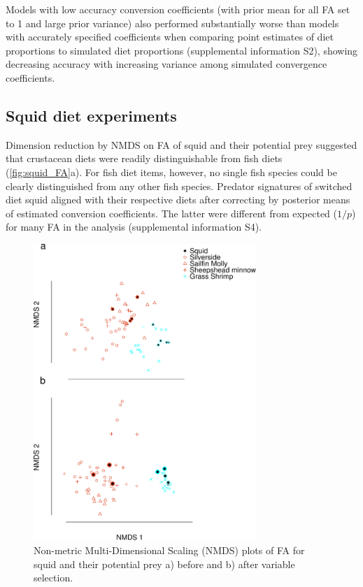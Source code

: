 \documentclass{article}%
\begin{document}
\begin{spacing}{1.9}
\begin{flushleft}
Models with low accuracy conversion coefficients (with prior mean for
all FA set to 1 and large prior variance) also performed substantially
worse than models with accurately specified coefficients when
comparing point estimates of diet proportions to simulated diet
proportions (supplemental information S2), showing decreasing accuracy with increasing variance among simulated convergence coefficients.

\subsection{Squid diet experiments}

Dimension reduction by NMDS on FA of squid and their potential prey suggested that crustacean diets were
readily distinguishable from fish diets
(\autoref{fig:squid_FA}a). For fish diet items, however, no single
fish species could be clearly distinguished from any other fish species. Predator signatures of switched diet squid aligned with their
respective diets after correcting by posterior means of estimated conversion
coefficients. The latter were different from expected ($1/p$) for many
FA in the analysis (supplemental information S4).


\begin{figure}
  \begin{center}
      \includegraphics[width=0.75\textwidth]{figures/2nd_NMDS_pre.pdf}
    \caption{Non-metric Multi-Dimensional Scaling (NMDS) plots of FA
      for 
      squid and their potential prey a) before and b) after variable selection.}
    \label{fig:squid_FA}
  \end{center}
\end{figure}


\end{flushleft}
\end{spacing}
\end{document}
